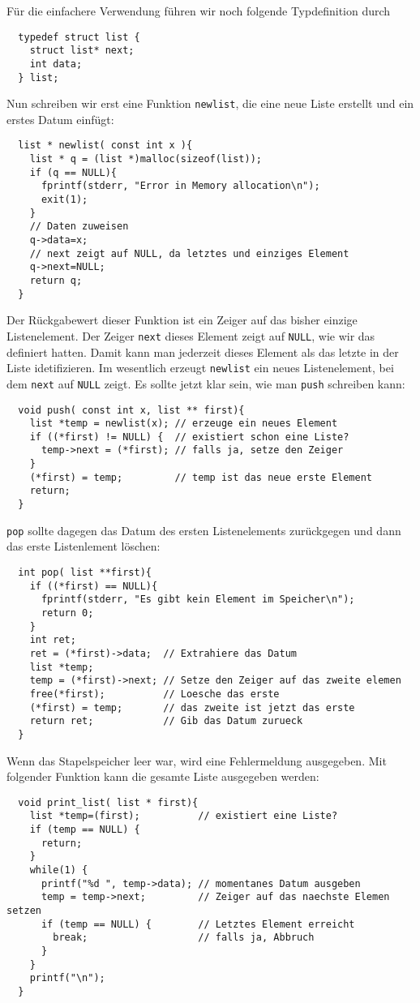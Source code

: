 Für die einfachere Verwendung führen wir noch folgende Typdefinition durch
\begin{lstlisting}
  typedef struct list {
    struct list* next;
    int data;
  } list;
\end{lstlisting}
Nun schreiben wir erst eine Funktion \verb|newlist|, die eine neue Liste erstellt und ein erstes Datum einfügt:
\begin{lstlisting}
  list * newlist( const int x ){
    list * q = (list *)malloc(sizeof(list));
    if (q == NULL){
      fprintf(stderr, "Error in Memory allocation\n");
      exit(1);
    }
    // Daten zuweisen 
    q->data=x;
    // next zeigt auf NULL, da letztes und einziges Element
    q->next=NULL;
    return q;
  }
\end{lstlisting}
Der Rückgabewert dieser Funktion ist ein Zeiger auf das bisher einzige Listenelement.
Der Zeiger \verb|next| dieses Element zeigt auf \verb|NULL|, wie wir das definiert hatten.
Damit kann man jederzeit dieses Element als das letzte in der Liste idetifizieren.
Im wesentlich erzeugt \verb|newlist| ein neues Listenelement, bei dem \verb|next| auf \verb|NULL| zeigt.
Es sollte jetzt klar sein, wie man \verb|push| schreiben kann:
\begin{lstlisting}
  void push( const int x, list ** first){
    list *temp = newlist(x); // erzeuge ein neues Element
    if ((*first) != NULL) {  // existiert schon eine Liste?
      temp->next = (*first); // falls ja, setze den Zeiger
    }
    (*first) = temp;         // temp ist das neue erste Element
    return;
  }
\end{lstlisting}
\verb|pop| sollte dagegen das Datum des ersten Listenelements zurückgegen und dann das erste Listenlement löschen:
\begin{lstlisting}
  int pop( list **first){
    if ((*first) == NULL){
      fprintf(stderr, "Es gibt kein Element im Speicher\n");
      return 0;
    }
    int ret;
    ret = (*first)->data;  // Extrahiere das Datum
    list *temp;
    temp = (*first)->next; // Setze den Zeiger auf das zweite elemen
    free(*first);          // Loesche das erste
    (*first) = temp;       // das zweite ist jetzt das erste
    return ret;            // Gib das Datum zurueck
  }
\end{lstlisting}
Wenn das Stapelspeicher leer war, wird eine Fehlermeldung ausgegeben.
Mit folgender Funktion kann die gesamte Liste ausgegeben werden:
\begin{lstlisting}
  void print_list( list * first){
    list *temp=(first);          // existiert eine Liste?
    if (temp == NULL) {          
      return;
    }
    while(1) {
      printf("%d ", temp->data); // momentanes Datum ausgeben
      temp = temp->next;         // Zeiger auf das naechste Elemen setzen
      if (temp == NULL) {        // Letztes Element erreicht
        break;                   // falls ja, Abbruch
      }
    }
    printf("\n");
  }
\end{lstlisting}
